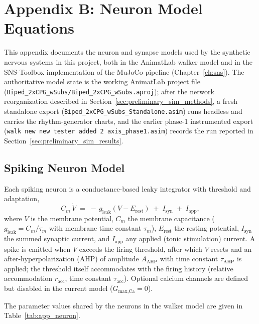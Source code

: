 \chapter{Appendix B: Neuron Model Equations}\label{app:neuron_equations}
\graphicspath{{D:/Github/Bipedal_Robot/Documentation/Reports and Papers/Dissertation/Figures/93-AppendixB/}{figs/93-AppendixB/}}

This appendix documents the neuron and synapse models used by the synthetic nervous systems in this project, both in the AnimatLab walker model and in the SNS-Toolbox implementation of the MuJoCo pipeline (Chapter~\ref{ch:sns}). The authoritative model state is the working AnimatLab project file (\texttt{Biped\_2xCPG\_wSubs/Biped\_2xCPG\_wSubs.aproj}); after the network reorganization described in Section~\ref{sec:preliminary_sim_methods}, a fresh standalone export (\texttt{Biped\_2xCPG\_wSubs\_Standalone.asim}) runs headless and carries the rhythm-generator charts, and the earlier phase-1 instrumented export (\texttt{walk new new tester added 2 axis\_phase1.asim}) records the run reported in Section~\ref{sec:preliminary_sim_results}.

\section{Spiking Neuron Model}

Each spiking neuron is a conductance-based leaky integrator with threshold and adaptation,
\begin{equation}
    C_{m}\,\dot{V} \;=\; -\,g_{\text{leak}}\left(V - E_{\text{rest}}\right)
                      \;+\; I_{\text{syn}} \;+\; I_{\text{app}},
    \label{eq:app_membrane}
\end{equation}
where $V$ is the membrane potential, $C_{m}$ the membrane capacitance ($g_{\text{leak}} = C_{m}/\tau_{m}$ with membrane time constant $\tau_{m}$), $E_{\text{rest}}$ the resting potential, $I_{\text{syn}}$ the summed synaptic current, and $I_{\text{app}}$ any applied (tonic stimulation) current. A spike is emitted when $V$ exceeds the firing threshold, after which $V$ resets and an after-hyperpolarization (AHP) of amplitude $A_{\text{AHP}}$ with time constant $\tau_{\text{AHP}}$ is applied; the threshold itself accommodates with the firing history (relative accommodation $r_{\text{acc}}$, time constant $\tau_{\text{acc}}$). Optional calcium channels are defined but disabled in the current model ($G_{\text{max,Ca}} = 0$).

The parameter values shared by the neurons in the walker model are given in Table~\ref{tab:app_neuron}.

